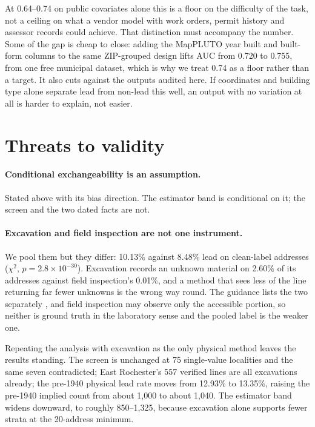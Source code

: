 \documentclass[11pt]{article}
\begin{document}
At 0.64--0.74 on public covariates alone this is a floor on the difficulty of the task, not a
ceiling on what a vendor model with work orders, permit history and assessor records could
achieve. That distinction must accompany the number. Some of the gap is cheap to close: adding
the MapPLUTO year built and built-form columns to the same ZIP-grouped design lifts AUC from
0.720 to 0.755, from one free municipal dataset, which is why we treat 0.74 as a floor rather
than a target. It also cuts against the outputs audited here. If coordinates and building type
alone separate lead from non-lead this well, an output with no variation at all is harder to
explain, not easier.

\section{Threats to validity}\label{sec:threats}

\paragraph{Conditional exchangeability is an assumption.}
Stated above with its bias direction. The estimator band is conditional on it; the screen and
the two dated facts are not.

\paragraph{Excavation and field inspection are not one instrument.}
We pool them but they differ: 10.13\% against 8.48\% lead on clean-label addresses
($\chi^2$, $p = 2.8\times10^{-30}$). Excavation records an unknown material on 2.60\% of its
addresses against field inspection's 0.01\%, and a method that sees less of the line returning
far fewer unknowns is the wrong way round. The guidance lists the two separately
\cite{nysdohguidance2025}, and field inspection may observe only the accessible portion, so
neither is ground truth in the laboratory sense and the pooled label is the weaker one.

Repeating the analysis with excavation as the only physical method leaves the results
standing. The screen is unchanged at 75 single-value localities and the same seven
contradicted; East Rochester's 557 verified lines are all excavations already; the pre-1940
physical lead rate moves from 12.93\% to 13.35\%, raising the pre-1940 implied count from
about 1,000 to about 1,040. The estimator band widens downward, to roughly 850--1,325, because
excavation alone supports fewer strata at the 20-address minimum.
\end{document}

